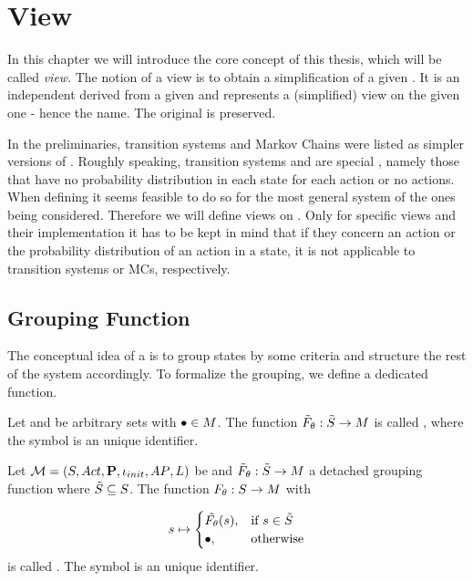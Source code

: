 \documentclass[preview]{standalone}
\begin{document}
	
\section{View}  \label{ch:view}

In this chapter we will introduce the core concept of this thesis, which will be called \emph{view}. The notion of a view is to obtain a simplification of a given \mdpN. It is an independent \mdpN derived from a given \mdpN and represents a (simplified) view on the given one - hence the name. The original \mdpN is preserved.

In the preliminaries, transition systems and Markov Chains were listed as simpler versions of \mdpsN. Roughly speaking, transition systems and \mdpsN are special \mdpsN, namely those that have no probability distribution in each state for each action or no actions. When defining \viewsN it seems feasible to do so for the most general system of the ones being considered. Therefore we will define views on \mdpsN. Only for specific views and their implementation it has to be kept in mind that if they concern an action or the probability distribution of an action in a state, it is not applicable to transition systems or MCs, respectively.

\subsection{Grouping Function}
The conceptual idea of a \viewN is to group states by some criteria and structure the rest of the system accordingly. To formalize the grouping, we define a dedicated function.

\begin{definition}
	Let \smstates and \arbset be arbitrary sets with ${\bullet} \in {M}$. The function ${\tilde{F}_{{\theta}}} : {\tilde{{S}}} \to {\ensuremath{{M}}}$ is called \emph{\grpfctsubN}, where the symbol \viewppty is an unique identifier.
	
	\label{def:grpfctsub}
\end{definition}


\begin{definition}
	Let ${{{\mathcal{M}}}} = {{({S}, {Act}, {\textbf{P}}, {\iota_{init}}, {AP}, {L})}}$ be \achgphN and ${\tilde{F}_{{\theta}}} : {\tilde{{S}}} \to {\ensuremath{{M}}}$ a detached grouping function where ${\tilde{{S}}} \subseteq {S}$. The function ${F_{{\theta}}} : {S} \to {\ensuremath{{M}}}$ with	
	
	\[
	\state \mapsto
	\begin{cases}
		\tilde\grpfct(s),				& \text{if } \state \in \smstates \\ 		\remelem,          	& \text{otherwise}
	\end{cases}
	\]	
	is called \emph{\grpfctN}. The symbol \viewppty is an unique identifier.
	
	\label{def:grpfct}
\end{definition}
\end{document}
